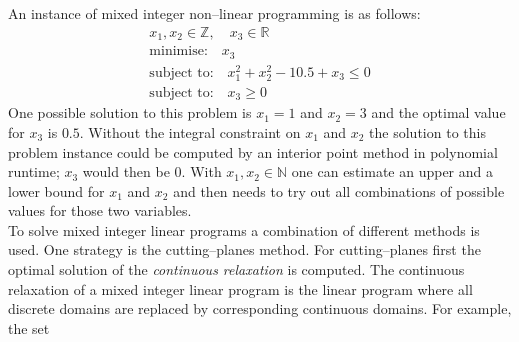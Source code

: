% 
% 
An instance of mixed integer non--linear programming is as follows:
\begin{eqnarray}
x_1,x_2\in \mathbb{Z},\quad x_3\in \mathbb{R}\\
\text{minimise:}\quad x_3 \\
\text{subject to:}\quad x_1^2 + x_2^2 - 10.5 + x_3 \leq 0 \\
\text{subject to:}\quad x_3 \geq 0
\end{eqnarray}
One possible solution to this problem is $x_1=1$ and $x_2=3$ and the optimal value for $x_3$ is $0.5$. Without the integral constraint on $x_1$ and $x_2$ the solution to this problem instance could be computed by an interior point method in polynomial runtime; $x_3$ would then be $0$. With $x_1,x_2\in \mathbb{N}$ one can estimate an upper and a lower bound for $x_1$ and $x_2$ and then needs to try out all combinations of possible values for those two variables.\\
To solve mixed integer linear programs a combination of different methods is used. One strategy is the cutting--planes method. For cutting--planes first the optimal solution of the \emph{continuous relaxation} is computed. The continuous relaxation of a mixed integer linear program is the linear program where all discrete domains are replaced by corresponding continuous domains. For example, the set 
